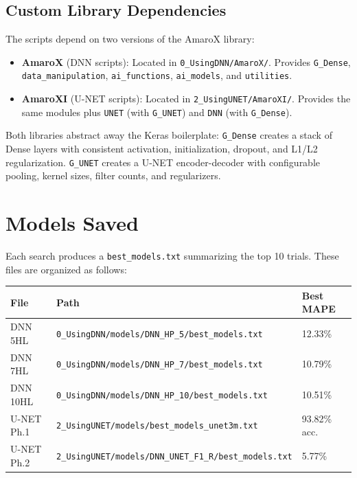 \documentclass[11pt,a4paper]{article}
\begin{document}
\subsection{Custom Library Dependencies}

The scripts depend on two versions of the AmaroX library:

\begin{itemize}
    \item \textbf{AmaroX} (DNN scripts): Located in \texttt{0\_UsingDNN/AmaroX/}. Provides \texttt{G\_Dense}, \texttt{data\_manipulation}, \texttt{ai\_functions}, \texttt{ai\_models}, and \texttt{utilities}.
    \item \textbf{AmaroXI} (U-NET scripts): Located in \texttt{2\_UsingUNET/AmaroXI/}. Provides the same modules plus \texttt{UNET} (with \texttt{G\_UNET}) and \texttt{DNN} (with \texttt{G\_Dense}).
\end{itemize}

Both libraries abstract away the Keras boilerplate: \texttt{G\_Dense} creates a stack of Dense layers with consistent activation, initialization, dropout, and L1/L2 regularization. \texttt{G\_UNET} creates a U-NET encoder-decoder with configurable pooling, kernel sizes, filter counts, and regularizers.

\section{Models Saved}

Each search produces a \texttt{best\_models.txt} summarizing the top 10 trials. These files are organized as follows:

\begin{table}[H]
\centering
\begin{tabular}{lp{7cm}l}
\toprule
\textbf{File} & \textbf{Path} & \textbf{Best MAPE} \\
\midrule
DNN 5HL  & \texttt{0\_UsingDNN/models/DNN\_HP\_5/best\_models.txt}  & 12.33\% \\
DNN 7HL  & \texttt{0\_UsingDNN/models/DNN\_HP\_7/best\_models.txt}  & 10.79\% \\
DNN 10HL & \texttt{0\_UsingDNN/models/DNN\_HP\_10/best\_models.txt} & 10.51\% \\
U-NET Ph.1 & \texttt{2\_UsingUNET/models/best\_models\_unet3m.txt} & 93.82\% acc. \\
U-NET Ph.2 & \texttt{2\_UsingUNET/models/DNN\_UNET\_F1\_R/best\_models.txt} & 5.77\% \\
\bottomrule
\end{tabular}
\end{table}
\end{document}
